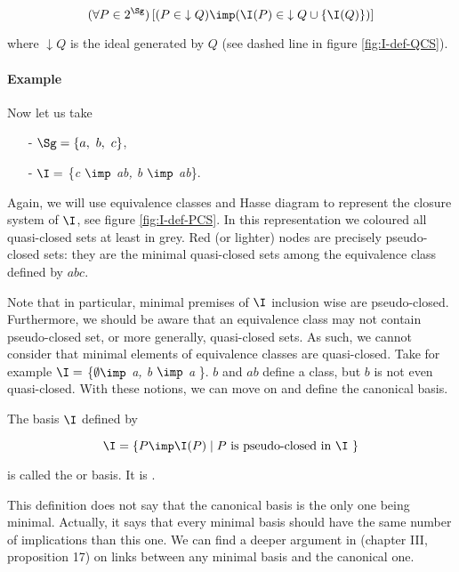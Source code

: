 \[ (\forall P \in 2^{\Sg})\left[( P \in \; \downarrow Q) \imp (\I(P) \in \; 
\downarrow Q \cup \{\I(Q)\})\right] \]

\noindent where $\downarrow Q$ is the ideal generated by $Q$ (see dashed line
in figure \ref{fig:I-def-QCS}). 

\paragraph{Example} Now let us take 
\begin{itemize}
	\item[-] $\Sg = \{a, \ b, \ c \}$,
	\item[-] $\I = $ \{\textit{c $\imp$ ab, b $\imp$ ab}\}.
\end{itemize}
Again, we will use equivalence classes and Hasse diagram to represent the 
closure system of $\I$, see figure \ref{fig:I-def-PCS}. In this representation
we coloured all quasi-closed sets at least in grey. Red (or lighter) nodes are
precisely pseudo-closed sets: they are the minimal quasi-closed sets among the
equivalence class defined by $abc$. 

\newpage

\begin{figure}[ht]
	
\end{figure}

Note that in particular, minimal premises of $\I$ inclusion wise are 
pseudo-closed. Furthermore, we should be aware that an equivalence class may
not contain pseudo-closed set, or more generally, quasi-closed sets. As such,
we cannot consider that minimal elements of equivalence classes are 
quasi-closed. Take for example $\I =$ \{\textit{$\emptyset \imp $ a, b $\imp$ a 
}\}. $b$ and $ab$ define a class, but $b$ is not even quasi-closed. With these
notions, we can move on and define the canonical basis.

\begin{definition} The basis $\I$ defined by
	
	\[ \I = \{ P \imp \I(P) \; | \; P \text{ is pseudo-closed in $\I$ } \} \]
	
	\noindent is called the  or  
	basis. 
	It is .
	
\end{definition}

\noindent This definition does not say that the canonical basis is the only one
being minimal. Actually, it says that every minimal basis should have the same
number of implications than this one. We can find a deeper argument in 
\cite{b._ganter_conceptual_2016} (chapter III, proposition 17) on links between any minimal basis and the canonical one.

